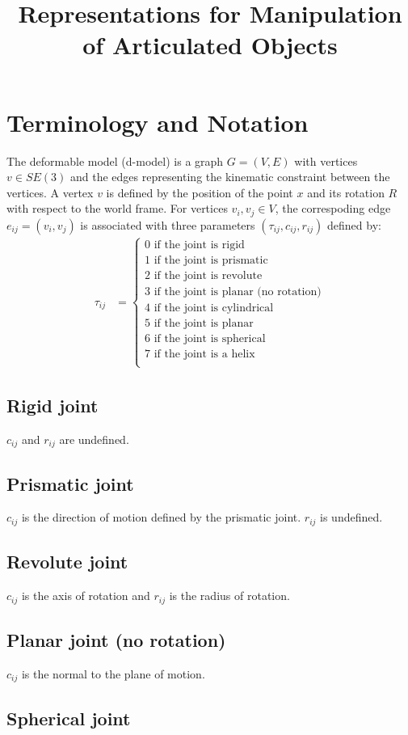 \documentclass[english]{article}
\begin{document}

\date{}
\title{\textbf{Representations for Manipulation of Articulated Objects}}
\maketitle
\section*{Terminology and Notation}
The deformable model (d-model) is a graph $G=(V,E)$ with vertices $v\in SE(3)$ and the edges
representing the kinematic constraint between the vertices. A vertex $v$ is defined by the
position of the point $x$ and its rotation $R$ with respect to the world frame.
For vertices $v_i, v_j\in V$, the correspoding edge $e_{ij}=(v_i,v_j)$ is associated with three parameters $(\tau_{ij}, c_{ij}, r_{ij})$ defined by:
\begin{align*}
  \tau_{ij} &= \begin{cases}
  0 \mbox{ if the joint is rigid}\\
  1 \mbox{ if the joint is prismatic} \\
  2 \mbox{ if the joint is revolute} \\
  3 \mbox{ if the joint is planar (no rotation)} \\
  4 \mbox{ if the joint is cylindrical} \\
  5 \mbox{ if the joint is planar} \\
  6 \mbox{ if the joint is spherical} \\
  7 \mbox{ if the joint is a helix} \\
\end{cases}
\end{align*}
\subsection*{Rigid joint}
 $c_{ij}$ and $r_{ij}$ are undefined.
\subsection*{Prismatic joint}
$c_{ij}$ is the direction of motion defined by the prismatic joint. $r_{ij}$ is undefined.
\subsection*{Revolute joint}
$c_{ij}$ is the axis of rotation and $r_{ij}$ is the radius of rotation.
\subsection*{Planar joint (no rotation)}
$c_{ij}$ is the normal to the plane of motion.
\subsection*{Spherical joint}
\end{document}
